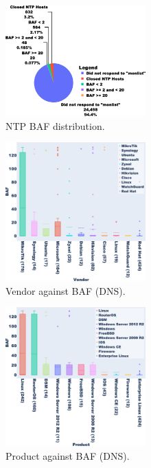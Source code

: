 \begin{figure}[t]
        \centering
        \includegraphics[width=0.48\textwidth]{research paper/plots/ntp_piechart_merged_trim.png}
        \caption{NTP BAF distribution.}
        \label{fig:piechart_ntp}
\end{figure}
    
\begin{figure}[t]
        \centering
        \includegraphics[width=0.48\textwidth]{research paper/plots/SL_vendor_boxplot_restricted_trim.png}
        \caption{Vendor against BAF (DNS).}
        \label{fig:boxplot_vendor}
\end{figure}
    
\begin{figure}[t]
        \centering
        \includegraphics[width=0.48\textwidth]{research paper/plots/SL_product_boxplot_restricted_trim.png}
        \caption{Product against BAF (DNS).}
        \label{fig:boxplot_product}
\end{figure}

